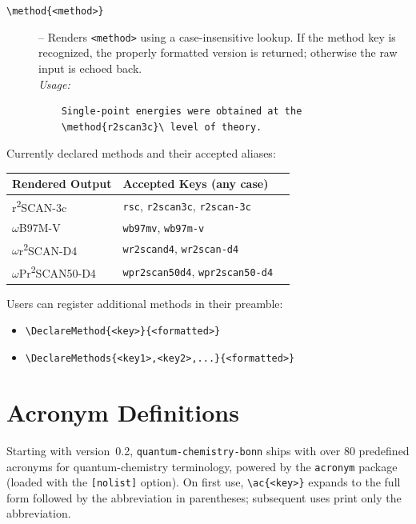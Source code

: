 \documentclass[a4paper,12pt]{article}
\begin{document}
\begin{description}
    \item[\texttt{\textbackslash method\{<method>\}}] – Renders \texttt{<method>} using a case-insensitive lookup.  If the method key is recognized, the properly formatted version is returned; otherwise the raw input is echoed back.\\
    \textit{Usage:}
    \begin{verbatim}
    Single-point energies were obtained at the
    \method{r2scan3c}\ level of theory.
    \end{verbatim}
\end{description}

\noindent Currently declared methods and their accepted aliases:

\bigskip
\begin{tabular}{@{}lll@{}}
\textbf{Rendered Output} & \textbf{Accepted Keys (any case)} \\
\midrule
r\textsuperscript{2}SCAN-3c & \texttt{rsc}, \texttt{r2scan3c}, \texttt{r2scan-3c} \\
$\omega$B97M-V & \texttt{wb97mv}, \texttt{wb97m-v} \\
$\omega$r\textsuperscript{2}SCAN-D4 & \texttt{wr2scand4}, \texttt{wr2scan-d4} \\
$\omega$Pr\textsuperscript{2}SCAN50-D4 & \texttt{wpr2scan50d4}, \texttt{wpr2scan50-d4} \\
\end{tabular}

\bigskip
\noindent Users can register additional methods in their preamble:
\begin{itemize}
  \item \verb|\DeclareMethod{<key>}{<formatted>}|
  \item \verb|\DeclareMethods{<key1>,<key2>,...}{<formatted>}|
\end{itemize}

\section{Acronym Definitions}
\label{sec:acronyms}
Starting with version~0.2, \texttt{quantum-chemistry-bonn} ships with over 80 predefined acronyms for quantum-chemistry terminology, powered by the \texttt{acronym} package (loaded with the \texttt{[nolist]} option). On first use, \verb|\ac{<key>}| expands to the full form followed by the abbreviation in parentheses; subsequent uses print only the abbreviation.
\end{document}
